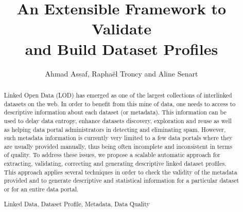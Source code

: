 \documentclass[runningheads,a4paper]{llncs}
\newcommand{\keywords}[1]{\par\addvspace\baselineskip
\noindent\keywordname\enspace\ignorespaces#1}
\begin{document}
\title{An Extensible Framework to Validate\\ and Build Dataset Profiles}

\author{Ahmad Assaf, Rapha\"{e}l Troncy and Aline Senart}



\maketitle


\begin{abstract}
Linked Open Data (LOD) has emerged as one of the largest collections of interlinked datasets on the web. In order to benefit from this mine of data, one needs to access to descriptive information about each dataset (or metadata). This information can be used to delay data entropy, enhance datasets discovery, exploration and reuse as well as helping data portal administrators in detecting and eliminating spam. However, such metadata information is currently very limited to a few data portals where they are usually provided manually, thus being often incomplete and inconsistent in terms of quality. To address these issues, we propose a scalable automatic approach for extracting, validating, correcting and generating descriptive linked dataset profiles. This approach applies several techniques in order to check the validity of the metadata provided and to generate descriptive and statistical information for a particular dataset or for an entire data portal.


\keywords{Linked Data, Dataset Profile, Metadata, Data Quality}
\end{abstract}
\end{document}
